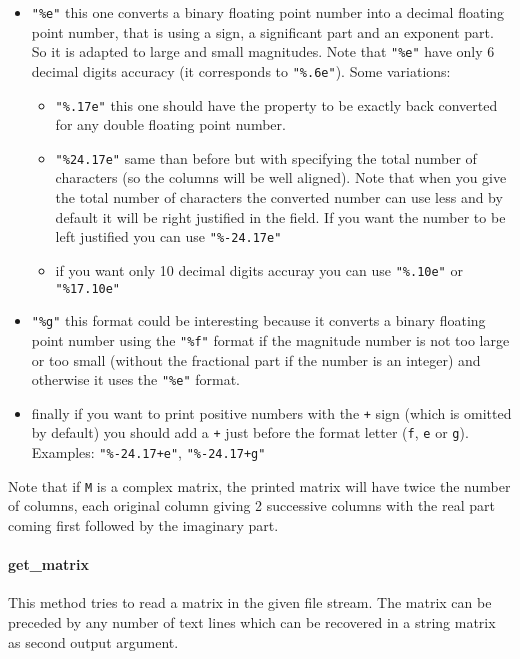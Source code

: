 \begin{itemize}
\begin{itemize}
\item \verb+"%e"+ this one converts a binary floating point number into a decimal
floating point number, that is using a sign, a significant part and an exponent
part. So it is adapted to large and small magnitudes. Note that  \verb+"%e"+ have 
only 6 decimal digits accuracy (it corresponds to  \verb+"%.6e"+). Some variations: 
\begin{itemize}
\item \verb+"%.17e"+ this one should have the property to be exactly back converted 
for any double floating point number.
\item \verb+"%24.17e"+ same than before but with specifying the total number of characters
(so the columns will be well aligned). Note that when you give the total number of 
characters the converted number can use less and by default it will be right justified 
in the field. If you want the number to be left justified you can use  \verb+"%-24.17e"+
\item if you want only 10 decimal digits accuray you can use  \verb+"%.10e"+ or
\verb+"%17.10e"+
\end{itemize}
\item  \verb+"%g"+ this format could be interesting because it converts a binary
floating point number using the \verb+"%f"+ format if the magnitude number is not too
large or too small (without the fractional part if the number is an integer) and 
otherwise it uses the \verb+"%e"+ format.

\item finally if you want to print positive numbers with the \verb-+- sign (which is
omitted by default) you should add a  \verb-+- just before the format letter (\verb+f+,
\verb+e+ or \verb+g+). Examples: \verb/"%-24.17+e"/, \verb/"%-24.17+g"/
\end{itemize}
\end{itemize}

Note that  if \verb+M+ is a complex matrix, the printed matrix will have twice the number
of columns, each original column giving 2 successive columns with the real part coming first
followed by the imaginary part.


\paragraph{get\_matrix}

 This method tries to read a matrix in the given file stream. The matrix can be preceded by
any number of text lines which can be recovered in a string matrix as second output argument.

